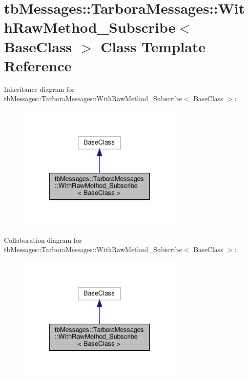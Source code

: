 \hypertarget{classtbMessages_1_1TarboraMessages_1_1WithRawMethod__Subscribe}{}\section{tb\+Messages\+:\+:Tarbora\+Messages\+:\+:With\+Raw\+Method\+\_\+\+Subscribe$<$ Base\+Class $>$ Class Template Reference}
\label{classtbMessages_1_1TarboraMessages_1_1WithRawMethod__Subscribe}


Inheritance diagram for tb\+Messages\+:\+:Tarbora\+Messages\+:\+:With\+Raw\+Method\+\_\+\+Subscribe$<$ Base\+Class $>$\+:
\nopagebreak
\begin{figure}[H]
\begin{center}
\leavevmode
\includegraphics[width=234pt]{classtbMessages_1_1TarboraMessages_1_1WithRawMethod__Subscribe__inherit__graph}
\end{center}
\end{figure}


Collaboration diagram for tb\+Messages\+:\+:Tarbora\+Messages\+:\+:With\+Raw\+Method\+\_\+\+Subscribe$<$ Base\+Class $>$\+:
\nopagebreak
\begin{figure}[H]
\begin{center}
\leavevmode
\includegraphics[width=234pt]{classtbMessages_1_1TarboraMessages_1_1WithRawMethod__Subscribe__coll__graph}
\end{center}
\end{figure}
